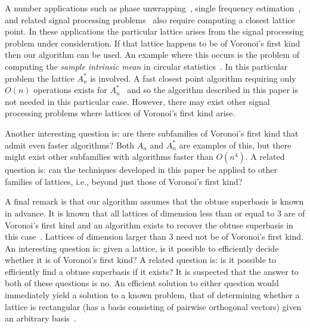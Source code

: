 \documentclass[final,leqno]{siamltex}
\begin{document}
A number applications such as phase unwrapping~\cite{Teunissen_GPS_1995,Hassibi_GPS_1998}, single frequency estimation~\cite{McKilliamFrequencyEstimationByPhaseUnwrapping2009}, and related signal processing problems~\cite{McKilliam2007,Clarkson2007,McKilliam2009IndentifiabliltyAliasingPolyphase,Quinn_sparse_noisy_SSP_2012} also require computing a closest lattice point.  In these applications the particular lattice arises from the signal processing problem under consideration.  If that lattice happens to be of Voronoi's first kind then our algorithm can be used.  An example where this occurs is the problem of computing the \emph{sample intrinsic mean} in circular statistics~\cite{McKilliam_mean_dir_est_sq_arc_length2010}.  In this particular problem the lattice $A_n^*$ is involved.  A fast closest point algorithm requiring only $O(n)$ operations exists for $A_n^*$~\cite{McKilliam2009CoxeterLattices,McKilliam2008b} and so the algorithm described in this paper is not needed in this particular case.  However, there may exist other signal processing problems where lattices of Voronoi's first kind arise.

Another interesting question is: are there subfamilies of Voronoi's first kind that admit even faster algorithms?  Both $A_n$ and $A_n^*$ are examples of this, but there might exist other subfamilies with algorithms faster than $O(n^4)$.  A related question is: can the techniques developed in this paper be applied to other families of lattices, i.e., beyond just those of Voronoi's first kind?  %

A final remark is that our algorithm assumes that the obtuse superbasis is known in advance.  It is known that all lattices of dimension less than or equal to 3 are of Voronoi's first kind and an algorithm exists to recover the obtuse superbasis in this case~\cite{SPLAG}.  Lattices of dimension larger than 3 need not be of Voronoi's first kind.  An interesting question is: given a lattice, is it possible to efficiently decide whether it is of Voronoi's first kind?  A related question is: is it possible to efficiently find a obtuse superbasis if it exists?  It is suspected that the answer to both of these questions is no.  An efficient solution to either question would immediately yield a solution to a known problem, that of determining whether a lattice is rectangular (has a basis consisting of pairwise orthogonal vectors) given an arbitrary basis~\cite{Lenstra_Silverberg_revisting_gentra_szydlo_2014}. 
\end{document}
